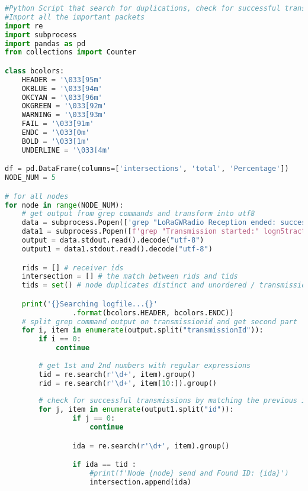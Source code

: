 \newpage
\begin{lstlisting}[language=Python, caption = Python Script that search for duplications\, check for successful transmissions and find out the overall and individual node PDRs, label=lst:DER]
#Python Script that search for duplications, check for successful transmissions and find out the overall and individual node DERs.
#Import all the important packets
import re
import subprocess
import pandas as pd
from collections import Counter

class bcolors:
    HEADER = '\033[95m'
    OKBLUE = '\033[94m'
    OKCYAN = '\033[96m'
    OKGREEN = '\033[92m'
    WARNING = '\033[93m'
    FAIL = '\033[91m'
    ENDC = '\033[0m'
    BOLD = '\033[1m'
    UNDERLINE = '\033[4m'

df = pd.DataFrame(columns=['intersections', 'total', 'Percentage'])
NODE_NUM = 5

# for all nodes
for node in range(NODE_NUM): 
    # get output from grep commands and transform into utf8
    data = subprocess.Popen(['grep "LoRaGWRadio Reception ended: successfully for" logn5tractormobgw1-29.elog | grep "transmissionId"'], shell=True, stdout = subprocess.PIPE)
    data1 = subprocess.Popen([f'grep "Transmission started:" logn5tractormobgw1-29.elog | grep "transmitterId = {node}" | grep "id"'], shell=True, stdout = subprocess.PIPE)
    output = data.stdout.read().decode("utf-8")
    output1 = data1.stdout.read().decode("utf-8")

    rids = [] # receiver ids
    intersection = [] # the match between rids and tids
    tids = set() # node duplicates distinct and unordered / transmission ids

    print('{}Searching logfile...{}'
                .format(bcolors.HEADER, bcolors.ENDC))
    # split grep command output on transmissionid and get second part
    for i, item in enumerate(output.split("transmissionId")):
        if i == 0:
            continue
        
        # get 1st and 2nd numbers with regular expressions
        tid = re.search(r'\d+', item).group()
        rid = re.search(r'\d+', item[10:]).group()
        
        # check for successful transmissions by matching the previous in the other grep command 
        for j, item in enumerate(output1.split("id")):
                if j == 0:
                    continue

                ida = re.search(r'\d+', item).group()

                if ida == tid :
                    #print(f'Node {node} send and Found ID: {ida}')
                    intersection.append(ida)



\end{lstlisting}

